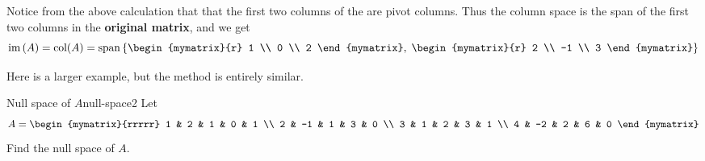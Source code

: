 \begin{solution}
  Notice from the above calculation that that the first two columns of
  the {\rref} are pivot columns. Thus the column space is the span of
  the first two columns in the \textbf{original matrix}, and we get
  \begin{equation*}
    \func{im}\tup{A} = \func{col}(A) =
    \sspan \set{\begin{mymatrix}{r}
        1 \\
        0 \\
        2
      \end{mymatrix}, \; \begin{mymatrix}{r}
        2 \\
        -1 \\
        3
      \end{mymatrix}  }
  \end{equation*}
\end{solution}

Here is a larger example, but the method is entirely similar.

\begin{example}{Null space of $A$}{null-space2}
  Let
  \begin{equation*}
    A=\begin{mymatrix}{rrrrr}
      1 & 2 & 1 & 0 & 1 \\
      2 & -1 & 1 & 3 & 0 \\
      3 & 1 & 2 & 3 & 1 \\
      4 & -2 & 2 & 6 & 0
    \end{mymatrix}
  \end{equation*}
  Find the null space of $A$.
\end{example}

